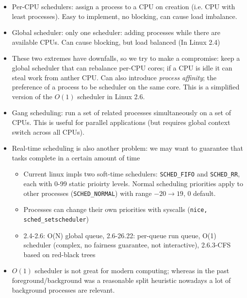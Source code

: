 \documentclass[../notes.tex]{subfiles}
\begin{document}
\begin{itemize}
    \item Per-CPU schedulers: assign a process to a CPU on creation (i.e. CPU with least processes). Easy to implement, no blocking, can cause load imbalance.
    \item Global scheduler: only one scheduler: adding processes while there are available CPUs. Can cause blocking, but load balanced (In Linux 2.4)
    \item These two extremes have downfalls, so we try to make a compromise: keep a global scheduler that can rebalance per-CPU cores; if a CPU is idle it can steal work from anther CPU. Can also introduce \textit{process affinity}; the preference of a process to be scheduler on the same core. This is a simplified version of the $ O(1) $ scheduler in Linux 2.6.
    \item Gang scheduling: run a set of related processes simultaneously on a set of CPUs. This is useful for parallel applications (but requires global context switch across all CPUs).
    \item Real-time scheduling is also another problem: we may want to guarantee that tasks complete in a certain amount of time
        \begin{itemize}
            \item Current linux impls two soft-time schedulers: \texttt{SCHED\_FIFO} and \texttt{SCHED\_RR}, each with 0-99 static prioirty levels. Normal scheduling priorities apply to other processes (\texttt{SCHED\_NORMAL}) with range $ -20 \to 19$, 0 default. 
            \item Processes can change their own priorities with syscalls (\texttt{nice, sched\_setscheduler})
            \item 2.4-2.6: O(N) global queue, 2.6-26.22: per-queue run queue, O(1) scheduler (complex, no fairness guarantee, not interactive), 2.6.3-CFS based on red-black trees
        \end{itemize}
    \item $ O(1) $ scheduler is not great for modern computing; whereas in the past foreground/background was a reasonable split heuristic nowadays a lot of background processes are relevant. 
\end{itemize}
\end{document}

